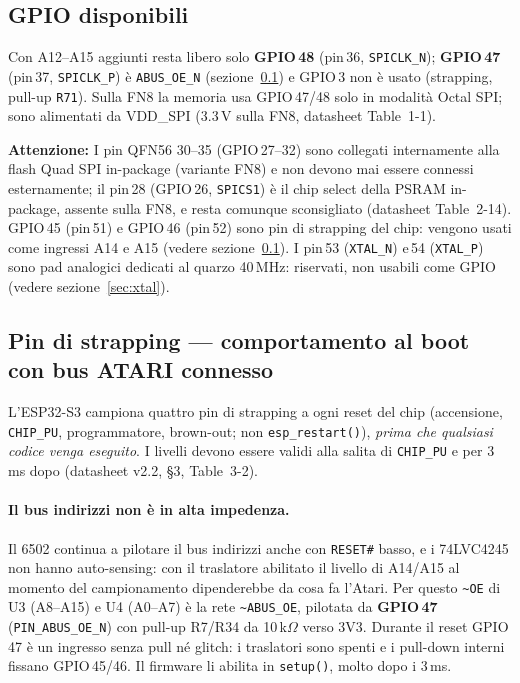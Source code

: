 \documentclass[12pt, a4paper]{article}
\begin{document}
\subsection*{GPIO disponibili}

Con A12--A15 aggiunti resta libero solo \textbf{GPIO\,48} (pin\,36, \texttt{SPICLK\_N}); \textbf{GPIO\,47} (pin\,37, \texttt{SPICLK\_P}) è \texttt{ABUS\_OE\_N} (sezione~\ref{sec:strapping}) e GPIO\,3 non è usato (strapping, pull-up \texttt{R71}). Sulla FN8 la memoria usa GPIO\,47/48 solo in modalità Octal SPI; sono alimentati da VDD\_SPI (3.3\,V sulla FN8, datasheet Table~1-1).

\noindent\textbf{Attenzione:} I pin QFN56 30--35 (GPIO\,27--32) sono collegati internamente alla flash Quad SPI in-package (variante FN8) e non devono mai essere connessi esternamente; il pin\,28 (GPIO\,26, \texttt{SPICS1}) è il chip select della PSRAM in-package, assente sulla FN8, e resta comunque sconsigliato (datasheet Table~2-14). GPIO\,45 (pin\,51) e GPIO\,46 (pin\,52) sono pin di strapping del chip: vengono usati come ingressi A14 e A15 (vedere sezione~\ref{sec:strapping}). I pin\,53 (\texttt{XTAL\_N}) e\,54 (\texttt{XTAL\_P}) sono pad analogici dedicati al quarzo 40\,MHz: riservati, non usabili come GPIO (vedere sezione~\ref{sec:xtal}).

\subsection{Pin di strapping — comportamento al boot con bus ATARI connesso}
\label{sec:strapping}

L'ESP32-S3 campiona quattro pin di strapping a ogni reset del chip (accensione,
\texttt{CHIP\_PU}, programmatore, brown-out; non \texttt{esp\_restart()}),
\emph{prima che qualsiasi codice venga eseguito}. I livelli devono essere validi alla
salita di \texttt{CHIP\_PU} e per 3\,ms dopo (datasheet v2.2, §3, Table~3-2).

\paragraph{Il bus indirizzi non è in alta impedenza.}
Il 6502 continua a pilotare il bus indirizzi anche con \texttt{RESET\#} basso, e i
74LVC4245 non hanno auto-sensing: con il traslatore abilitato il livello di A14/A15 al
momento del campionamento dipenderebbe da cosa fa l'Atari. Per questo \texttt{\~{}OE} di
U3 (A8--A15) e U4 (A0--A7) è la rete \texttt{\~{}ABUS\_OE}, pilotata da \textbf{GPIO\,47}
(\texttt{PIN\_ABUS\_OE\_N}) con pull-up R7/R34 da 10\,k$\Omega$ verso 3V3. Durante il reset
GPIO\,47 è un ingresso senza pull né glitch: i traslatori sono spenti e i pull-down interni
fissano GPIO\,45/46. Il firmware li abilita in \texttt{setup()}, molto dopo i 3\,ms.
\end{document}
